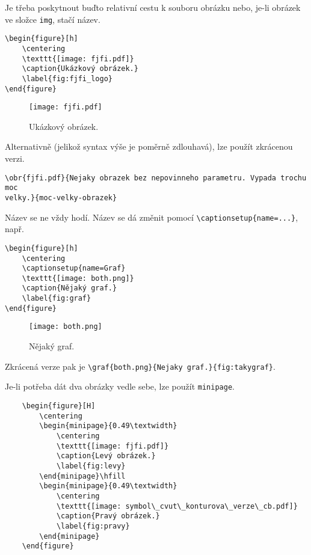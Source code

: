 \documentclass{cygclanek}
\begin{document}
Je třeba poskytnout buďto relativní cestu k souboru obrázku nebo, je-li obrázek ve složce \verb|img|, stačí 
název.

\begin{verbatim}
\begin{figure}[h]
    \centering
    \texttt{[image: fjfi.pdf]}
    \caption{Ukázkový obrázek.}
    \label{fig:fjfi_logo}
\end{figure}
\end{verbatim}

\begin{figure}[h]
    \centering
    \texttt{[image: fjfi.pdf]}
    \caption{Ukázkový obrázek.}
    \label{fig:fjfi_logo}
\end{figure}

Alternativně (jelikož syntax výše je poměrně zdlouhavá), lze použít zkrácenou verzi.
\begin{verbatim}
\obr{fjfi.pdf}{Nejaky obrazek bez nepovinneho parametru. Vypada trochu moc
velky.}{moc-velky-obrazek}
\end{verbatim}


Název  se ne vždy hodí. Název se dá změnit pomocí \verb|\captionsetup{name=...}|, např.

\begin{verbatim}
\begin{figure}[h]
    \centering
    \captionsetup{name=Graf}
    \texttt{[image: both.png]}
    \caption{Nějaký graf.}
    \label{fig:graf}
\end{figure}
\end{verbatim}

\begin{figure}[h]
    \centering
    \captionsetup{name=Graf}
    \texttt{[image: both.png]}
    \caption{Nějaký graf.}
    \label{fig:graf}
\end{figure}

Zkrácená verze pak je \verb|\graf{both.png}{Nejaky graf.}{fig:takygraf}|.

Je-li potřeba dát dva obrázky vedle sebe, lze použít \verb|minipage|.
\begin{verbatim}
    \begin{figure}[H]
        \centering
        \begin{minipage}{0.49\textwidth}
            \centering
            \texttt{[image: fjfi.pdf]}
            \caption{Levý obrázek.}
            \label{fig:levy}
        \end{minipage}\hfill
        \begin{minipage}{0.49\textwidth}
            \centering
            \texttt{[image: symbol\_cvut\_konturova\_verze\_cb.pdf]}
            \caption{Pravý obrázek.}
            \label{fig:pravy}
        \end{minipage}
    \end{figure}
\end{verbatim}
\end{document}

